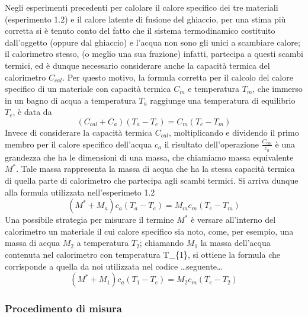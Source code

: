 \documentclass[11pt]{article}
\begin{document}
Negli esperimenti precedenti per calolare il calore specifico dei tre
materiali (esperimento 1.2) e il calore latente di fusione del ghiaccio,
per una stima più corretta si è tenuto conto del fatto che il sistema
termodinamico costituito dall'oggetto (oppure dal ghiaccio) e l'acqua
non sono gli unici a scambiare calore; il calorimetro stesso, (o meglio
una sua frazione) infatti, partecipa a questi scambi termici, ed è
dunque necessario considerare anche la capacità termica del calorimetro
\(C_{cal}\). Per questo motivo, la formula corretta per il calcolo del
calore specifico di un materiale con capacità termica \(C_{m}\) e
temperatura \(T_{m}\), che immerso in un bagno di acqua a temperatura
\(T_{a}\) raggiunge una temperatura di equilibrio \(T_{e}\), è data da
\[ (C_{cal} + C_{a})(T_{a}-T_{e}) = C_{m}(T_{e} - T_{m})\] Invece di
considerare la capacità termica \(C_{cal}\), moltiplicando e dividendo
il primo membro per il calore specifico dell'acqua \(c_{a}\) il
risultato dell'operazione \(\frac{C_{cal}}{c_{a}}\) è una grandezza che
ha le dimensioni di una massa, che chiamiamo massa equivalente \(M^*\).
Tale massa rappresenta la massa di acqua che ha la stessa capacità
termica di quella parte di calorimetro che partecipa agli scambi
termici. Si arriva dunque alla formula utilizzata nell'esperimeto 1.2
\[ (M^*+ M_{a})c_{a}(T_{a}-T_{e}) = M_{m}c_{m}(T_{e} - T_{m})\] Una
possibile strategia per misurare il termine \(M^*\) è versare
all'interno del calorimetro un materiale il cui calore specifico sia
noto, come, per esempio, una massa di acqua \(M_{2}\) a temperatura
\(T_{2}\); chiamando \(M_{1}\) la massa dell'acqua contenuta nel
calorimetro con temperatura T\_\{1\}, si ottiene la formula che
corrisponde a quella da noi utilizzata nel codice
\ldots{}seguente\ldots{}
\[ (M^*+ M_{1})c_{a}(T_{1}-T_{e}) = M_{2}c_{m}(T_{e} - T_{2})\]

\hypertarget{procedimento-di-misura}{%
\subsubsection{Procedimento di misura}\label{procedimento-di-misura}}
\end{document}

